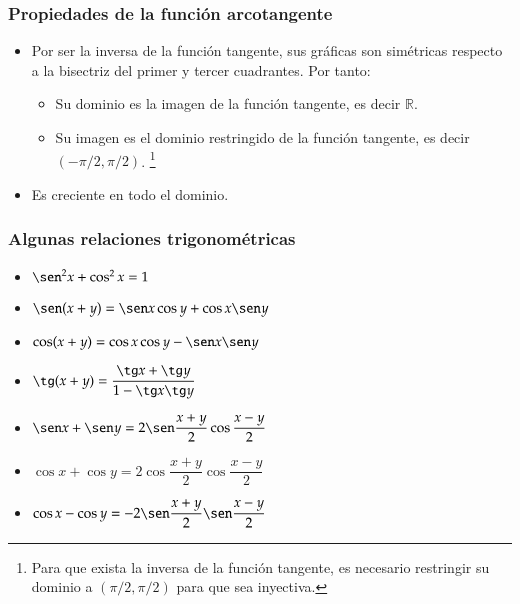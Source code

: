 \begin{frame}
\frametitle{Propiedades de la función arcotangente}
\begin{itemize}
\item Por ser la inversa de la función tangente, sus gráficas son simétricas respecto a la bisectriz del primer y tercer
cuadrantes. Por tanto:
\begin{itemize}
\item Su dominio es la imagen de la función tangente, es decir $\mathbb{R}$.
\item Su imagen es el dominio restringido de la función tangente, es decir $(-\pi/2,\pi/2)$.
\footnote{Para que exista la inversa de la función tangente, es necesario restringir su dominio a $(\pi/2,\pi/2)$ para que sea inyectiva.}
\end{itemize}
\item Es creciente en todo el dominio.
\end{itemize}
\end{frame} 


\begin{frame}
\frametitle{Algunas relaciones trigonométricas}
\begin{itemize}
\item $\sen^2 x+\cos^2 x=1$
\item $\sen(x+y)=\sen x \cos y+\cos x \sen y$
\item $\cos(x+y)=\cos x \cos y-\sen x \sen y$
\item $\tg (x+y)= \dfrac{\tg x+\tg y}{1-\tg x \tg y}$
\item $\sen x + \sen y = 2 \sen \dfrac{x+y}{2}\cos\dfrac{x-y}{2}$
\item $\cos x + \cos y = 2 \cos \dfrac{x+y}{2}\cos\dfrac{x-y}{2}$
\item $\cos x - \cos y = -2 \sen \dfrac{x+y}{2}\sen\dfrac{x-y}{2}$
\end{itemize}
\end{frame} 